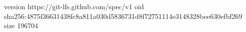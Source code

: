 version https://git-lfs.github.com/spec/v1
oid sha256:4875f36631438fc8a811a030d5836731d8f72751114e3148328bee630efbf269
size 196704
